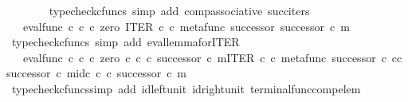 \begin{isabellebody}
\ \ \ \ \ \ \isamarkupfalse%
\ {\isacharparenleft}{\kern0pt}typecheck{\isacharunderscore}{\kern0pt}cfuncs{\isacharcomma}{\kern0pt}\ simp\ add{\isacharcolon}{\kern0pt}\ comp{\isacharunderscore}{\kern0pt}associative{}\ succ{\isacharunderscore}{\kern0pt}iters{\isacharparenright}{\kern0pt}\isanewline
\ \ \ \ \isamarkupfalse%
\ \isamarkupfalse%
\ {\isachardoublequoteopen}{\isachardot}{\kern0pt}{\isachardot}{\kern0pt}{\isachardot}{\kern0pt}\ {\isacharequal}{\kern0pt}\ eval{\isacharunderscore}{\kern0pt}func\ {\isasymnat}\isactrlsub c\ {\isasymnat}\isactrlsub c\ {\isasymcirc}\isactrlsub c\ {\isasymlangle}zero\ {\isacharcomma}{\kern0pt}ITER\ {\isasymnat}\isactrlsub c\ {\isasymcirc}\isactrlsub c\ {\isasymlangle}metafunc\ successor\ {\isacharcomma}{\kern0pt}successor\ {\isasymcirc}\isactrlsub c\ m{\isasymrangle}{\isasymrangle}{\isachardoublequoteclose}\isanewline
\ \ \ \ \ \ \isamarkupfalse%
\ {\isacharparenleft}{\kern0pt}typecheck{\isacharunderscore}{\kern0pt}cfuncs{\isacharcomma}{\kern0pt}\ simp\ add{\isacharcolon}{\kern0pt}\ eval{\isacharunderscore}{\kern0pt}lemma{\isacharunderscore}{\kern0pt}for{\isacharunderscore}{\kern0pt}ITER{\isacharparenright}{\kern0pt}\isanewline
\ \ \ \ \isamarkupfalse%
\ \isamarkupfalse%
\ {\isachardoublequoteopen}{\isachardot}{\kern0pt}{\isachardot}{\kern0pt}{\isachardot}{\kern0pt}\ {\isacharequal}{\kern0pt}\ eval{\isacharunderscore}{\kern0pt}func\ {\isasymnat}\isactrlsub c\ {\isasymnat}\isactrlsub c\ {\isasymcirc}\isactrlsub c\ {\isasymlangle}zero\ {\isasymcirc}\isactrlsub c\ {\isasymbeta}\isactrlbsub {\isasymnat}\isactrlsub c\isactrlesub \ {\isasymcirc}\isactrlsub c\ {\isacharparenleft}{\kern0pt}successor\ {\isasymcirc}\isactrlsub c\ m{\isacharparenright}{\kern0pt}{\isacharcomma}{\kern0pt}ITER\ {\isasymnat}\isactrlsub c\ {\isasymcirc}\isactrlsub c\ {\isasymlangle}metafunc\ successor\ {\isasymcirc}\isactrlsub c\ {\isasymbeta}\isactrlbsub {\isasymnat}\isactrlsub c\isactrlesub {\isasymcirc}\isactrlsub c\ {\isacharparenleft}{\kern0pt}successor\ {\isasymcirc}\isactrlsub c\ m{\isacharparenright}{\kern0pt}{\isacharcomma}{\kern0pt}id\isactrlsub c\ {\isasymnat}\isactrlsub c\ {\isasymcirc}\isactrlsub c\ {\isacharparenleft}{\kern0pt}successor\ {\isasymcirc}\isactrlsub c\ m{\isacharparenright}{\kern0pt}{\isasymrangle}{\isasymrangle}{\isachardoublequoteclose}\isanewline
\ \ \ \ \ \ \isamarkupfalse%
\ {\isacharparenleft}{\kern0pt}typecheck{\isacharunderscore}{\kern0pt}cfuncs{\isacharcomma}{\kern0pt}simp\ add{\isacharcolon}{\kern0pt}\ id{\isacharunderscore}{\kern0pt}left{\isacharunderscore}{\kern0pt}unit{}\ id{\isacharunderscore}{\kern0pt}right{\isacharunderscore}{\kern0pt}unit{}\ terminal{\isacharunderscore}{\kern0pt}func{\isacharunderscore}{\kern0pt}comp{\isacharunderscore}{\kern0pt}elem{\isacharparenright}{\kern0pt}\isanewline

\end{isabellebody}
